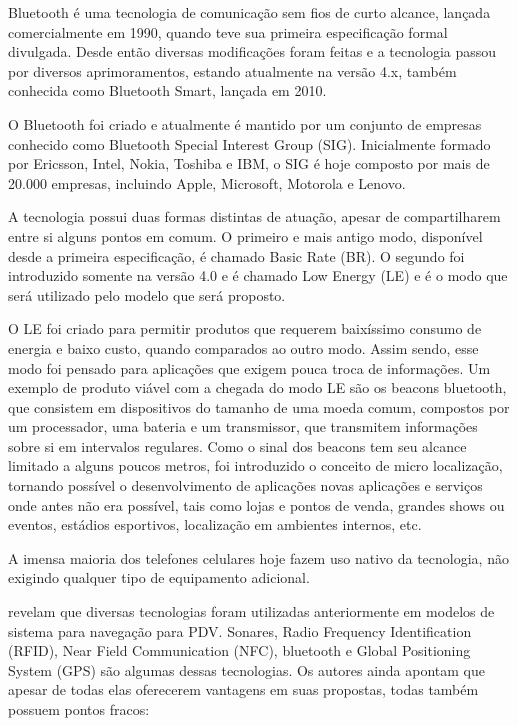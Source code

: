 \documentclass[english,brazilian]{UNISINOSmonografia}
\begin{document}
Bluetooth é uma tecnologia de comunicação sem fios de curto alcance, lançada comercialmente em 1990, quando teve sua primeira especificação formal divulgada. Desde então diversas modificações foram feitas e a tecnologia passou por diversos aprimoramentos, estando atualmente na versão 4.x, também conhecida como Bluetooth Smart, lançada em 2010. 

O Bluetooth foi criado e atualmente é mantido por um conjunto de empresas conhecido como Bluetooth Special Interest Group (SIG). Inicialmente formado por Ericsson, Intel, Nokia, Toshiba e IBM, o SIG é hoje composto por mais de 20.000 empresas, incluindo Apple, Microsoft, Motorola e Lenovo.

A tecnologia possui duas formas distintas de atuação, apesar de compartilharem entre si alguns pontos em comum. O primeiro e mais antigo modo, disponível desde a primeira especificação, é chamado Basic Rate (BR). O segundo foi introduzido somente na versão 4.0 e é chamado Low Energy (LE) e é o modo que será utilizado pelo modelo que será proposto.

O LE foi criado para permitir produtos que requerem baixíssimo consumo de energia e baixo custo, quando comparados ao outro modo. Assim sendo, esse modo foi pensado para aplicações que exigem pouca troca de informações. Um exemplo de produto viável com a chegada do modo LE são os beacons bluetooth, que consistem em dispositivos do tamanho de uma moeda comum, compostos por um processador, uma bateria e um transmissor, que transmitem informações sobre si em intervalos regulares. Como o sinal dos beacons tem seu alcance limitado a alguns poucos metros, foi introduzido o conceito de micro localização, tornando possível o desenvolvimento de aplicações novas aplicações e serviços onde antes não era possível, tais como lojas e pontos de venda, grandes shows ou eventos, estádios esportivos, localização em ambientes internos, etc.

A imensa maioria dos telefones celulares hoje fazem uso nativo da tecnologia, não exigindo qualquer tipo de equipamento adicional.

 revelam que diversas tecnologias foram utilizadas anteriormente em modelos de sistema para navegação para PDV. Sonares, Radio Frequency Identification (RFID), Near Field Communication (NFC), bluetooth e Global Positioning System (GPS) são algumas dessas tecnologias. Os autores ainda apontam que apesar de todas elas oferecerem vantagens em suas propostas, todas também possuem pontos fracos:
\end{document}
